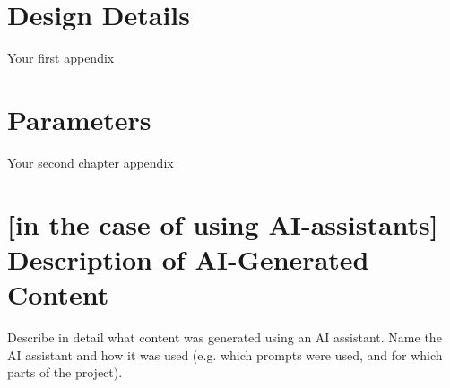\documentclass[report.tex]{subfiles}
\begin{document}
    \chapter{Design Details}
    Your first appendix

    \chapter{Parameters}
    Your second chapter appendix

    \chapter{[in the case of using AI-assistants] Description of AI-Generated Content}
    Describe in detail what content was generated using an AI assistant.
    Name the AI assistant and how it was used (e.g. which prompts were used, and for which parts of the project).
\end{document}
